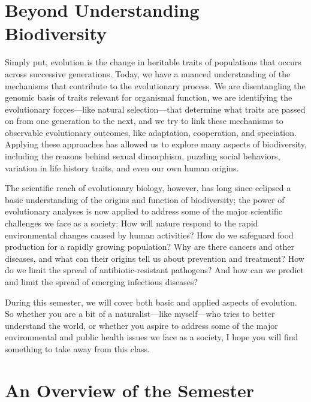 \documentclass[
]{book}
\begin{document}
\hypertarget{beyond-understanding-biodiversity}{%
\section*{Beyond Understanding Biodiversity}\label{beyond-understanding-biodiversity}}

Simply put, evolution is the change in heritable traits of populations that occurs across successive generations. Today, we have a nuanced understanding of the mechanisms that contribute to the evolutionary process. We are disentangling the genomic basis of traits relevant for organismal function, we are identifying the evolutionary forces---like natural selection---that determine what traits are passed on from one generation to the next, and we try to link these mechanisms to observable evolutionary outcomes, like adaptation, cooperation, and speciation. Applying these approaches has allowed us to explore many aspects of biodiversity, including the reasons behind sexual dimorphism, puzzling social behaviors, variation in life history traits, and even our own human origins.

The scientific reach of evolutionary biology, however, has long since eclipsed a basic understanding of the origins and function of biodiversity; the power of evolutionary analyses is now applied to address some of the major scientific challenges we face as a society: How will nature respond to the rapid environmental changes caused by human activities? How do we safeguard food production for a rapidly growing population? Why are there cancers and other diseases, and what can their origins tell us about prevention and treatment? How do we limit the spread of antibiotic-resistant pathogens? And how can we predict and limit the spread of emerging infectious diseases?

During this semester, we will cover both basic and applied aspects of evolution. So whether you are a bit of a naturalist---like myself---who tries to better understand the world, or whether you aspire to address some of the major environmental and public health issues we face as a society, I hope you will find something to take away from this class.

\hypertarget{an-overview-of-the-semester}{%
\section*{An Overview of the Semester}\label{an-overview-of-the-semester}}
\end{document}
